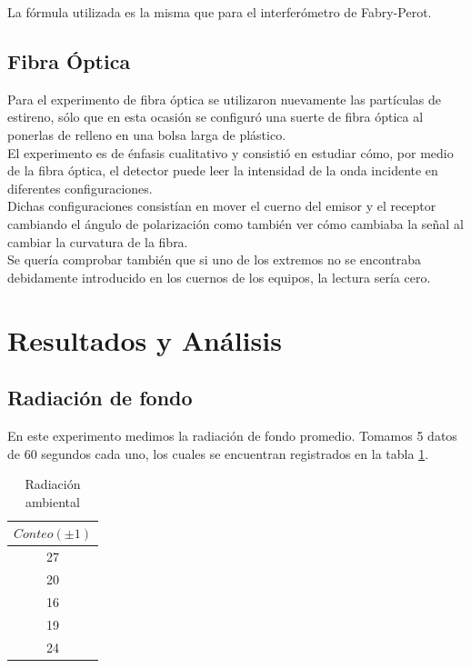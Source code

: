 \documentclass[%
 reprint,
 amsmath,amssymb,
 aps,
]{revtex4-1}
\begin{document}
La fórmula utilizada es la misma que para el interferómetro de Fabry-Perot. \\


\subsection{\label{sec:level2}Fibra Óptica}

Para el experimento de fibra óptica se utilizaron nuevamente las partículas de estireno, sólo que en esta ocasión se configuró una suerte de fibra óptica al ponerlas de relleno en una bolsa larga de plástico. \\

El experimento es de énfasis cualitativo y consistió en estudiar cómo, por medio de la fibra óptica, el detector puede leer la intensidad de la onda incidente en diferentes configuraciones. \\

Dichas configuraciones consistían en mover el cuerno del emisor y el receptor cambiando el ángulo de polarización como también ver cómo cambiaba la señal al cambiar la curvatura de la fibra. \\ 

Se quería comprobar también que si uno de los extremos no se encontraba debidamente introducido en los cuernos de los equipos, la lectura sería cero. \\


\section{\label{sec:level1}Resultados y An\'alisis}

\subsection{\label{sec:level2}Radiación de fondo}
En este experimento medimos la radiación de fondo promedio. Tomamos 5 datos de 60 segundos cada uno, los cuales se encuentran registrados en la tabla \ref{table:fondo}.\\

\begin{table}[h!]
\centering
\begin{tabular}{|c|}
	\hline $ Conteo (\pm 1) $ \\ 
	\hline\hline
	27\\
	20\\
	16\\
	19\\
	24\\
	[1ex] 
 \hline
 \end{tabular} 
  \caption{Radiación ambiental}
\label{table:fondo} 
\end{table}
\end{document}
